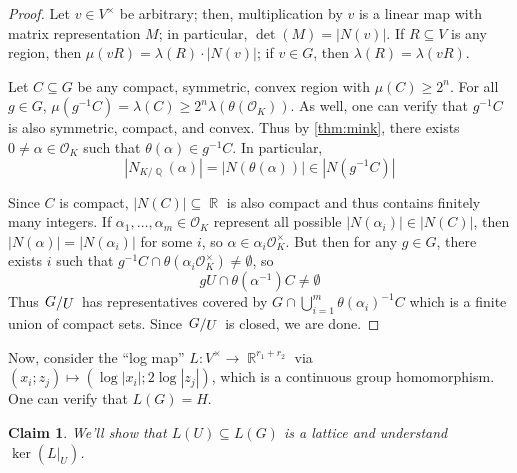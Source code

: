 \documentclass[11pt, a4paper]{memoir}
\DeclareMathOperator{\Q}{{\mathbb{Q}}}
\DeclareMathOperator{\R}{{\mathbb{R}}}
\newcommand{\abs}[1]{\ensuremath{\left\lvert#1\right\rvert}}
\theoremstyle{change}
\theoremstyle{plain}
\newtheorem{claim}{Claim}
\theoremstyle{nonumberplain}
\newtheorem{proof}{Proof}
\newcommand{\quot}[2]{\mathchoice{\left.\raisebox{0.13em}{$#1$}\middle/\raisebox{-0.13em}{$#2$}\right.}
                                 {\left.\raisebox{0.07em}{$#1$}\middle/\raisebox{-0.07em}{$#2$}\right.}
                                 {\left.\raisebox{0.03em}{$#1$}\middle/\raisebox{-0.03em}{$#2$}\right.}
                                 {\left.\raisebox{0em}{$#1$}\middle/\raisebox{0em}{$#2$}\right.}}
\numberwithin{equation}{section}
\begin{document}
\begin{proof}
    Let $v\in V^\times$ be arbitrary; then, multiplication by $v$ is a linear map with matrix representation $M$; in particular, $\det(M)=|N(v)|$.
    If $R\subseteq V$ is any region, then $\mu(vR)=\lambda(R)\cdot|N(v)|$; if $v\in G$, then $\lambda(R)=\lambda(vR)$.

    Let $C\subseteq G$ be any compact, symmetric, convex region with $\mu(C)\geq 2^n$.
    For all $g\in G$, $\mu(g^{-1}C)=\lambda(C)\geq 2^n\lambda(\theta(\mathcal{O}_K))$.
    As well, one can verify that $g^{-1}C$ is also symmetric, compact, and convex.
    Thus by \cref{thm:mink}, there exists $0\neq\alpha\in\mathcal{O}_K$ such that $\theta(\alpha)\in g^{-1}C$.
    In particular,
    \begin{equation*}
        \abs{N_{K/\Q}(\alpha)}=\abs{N(\theta(\alpha))}\in\abs{N(g^{-1}C)}
    \end{equation*}

    Since $C$ is compact, $|N(C)|\subseteq\R$ is also compact and thus contains finitely many integers.
    If $\alpha_1,\ldots,\alpha_m\in\mathcal{O}_K$ represent all possible $|N(\alpha_i)|\in|N(C)|$, then $|N(\alpha)|=|N(\alpha_i)|$ for some $i$, so $\alpha\in\alpha_i\mathcal{O}_K^\times$.
    But then for any $g\in G$, there exists $i$ such that $g^{-1}C\cap\theta(\alpha_i\mathcal{O}_K^\times)\neq\emptyset$, so
    \begin{equation*}
        gU\cap\theta(\alpha^{-1})C\neq\emptyset
    \end{equation*}
    Thus $\quot{G}{U}$ has representatives covered by $G\cap\bigcup_{i=1}^m\theta(\alpha_i)^{-1}C$ which is a finite union of compact sets.
    Since $\quot{G}{U}$ is closed, we are done.
\end{proof}
Now, consider the ``log map'' $L:V^\times\to\R^{r_1+r_2}$ via $(x_i;z_j)\mapsto(\log|x_i|;2\log|z_j|)$, which is a continuous group homomorphism.
One can verify that $L(G)=H$.
\begin{claim}
    We'll show that $L(U)\subseteq L(G)$ is a lattice and understand $\ker(L|_U)$.
\end{claim}
\end{document}
